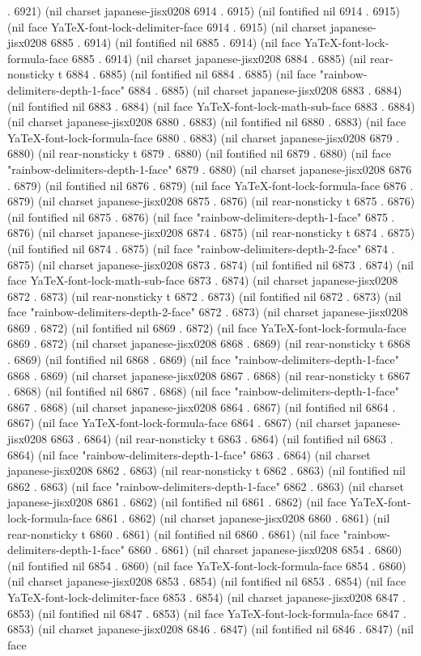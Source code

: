 . 6921) (nil charset japanese-jisx0208 6914 . 6915) (nil fontified nil 6914 . 6915) (nil face YaTeX-font-lock-delimiter-face 6914 . 6915) (nil charset japanese-jisx0208 6885 . 6914) (nil fontified nil 6885 . 6914) (nil face YaTeX-font-lock-formula-face 6885 . 6914) (nil charset japanese-jisx0208 6884 . 6885) (nil rear-nonsticky t 6884 . 6885) (nil fontified nil 6884 . 6885) (nil face "rainbow-delimiters-depth-1-face" 6884 . 6885) (nil charset japanese-jisx0208 6883 . 6884) (nil fontified nil 6883 . 6884) (nil face YaTeX-font-lock-math-sub-face 6883 . 6884) (nil charset japanese-jisx0208 6880 . 6883) (nil fontified nil 6880 . 6883) (nil face YaTeX-font-lock-formula-face 6880 . 6883) (nil charset japanese-jisx0208 6879 . 6880) (nil rear-nonsticky t 6879 . 6880) (nil fontified nil 6879 . 6880) (nil face "rainbow-delimiters-depth-1-face" 6879 . 6880) (nil charset japanese-jisx0208 6876 . 6879) (nil fontified nil 6876 . 6879) (nil face YaTeX-font-lock-formula-face 6876 . 6879) (nil charset japanese-jisx0208 6875 . 6876) (nil rear-nonsticky t 6875 . 6876) (nil fontified nil 6875 . 6876) (nil face "rainbow-delimiters-depth-1-face" 6875 . 6876) (nil charset japanese-jisx0208 6874 . 6875) (nil rear-nonsticky t 6874 . 6875) (nil fontified nil 6874 . 6875) (nil face "rainbow-delimiters-depth-2-face" 6874 . 6875) (nil charset japanese-jisx0208 6873 . 6874) (nil fontified nil 6873 . 6874) (nil face YaTeX-font-lock-math-sub-face 6873 . 6874) (nil charset japanese-jisx0208 6872 . 6873) (nil rear-nonsticky t 6872 . 6873) (nil fontified nil 6872 . 6873) (nil face "rainbow-delimiters-depth-2-face" 6872 . 6873) (nil charset japanese-jisx0208 6869 . 6872) (nil fontified nil 6869 . 6872) (nil face YaTeX-font-lock-formula-face 6869 . 6872) (nil charset japanese-jisx0208 6868 . 6869) (nil rear-nonsticky t 6868 . 6869) (nil fontified nil 6868 . 6869) (nil face "rainbow-delimiters-depth-1-face" 6868 . 6869) (nil charset japanese-jisx0208 6867 . 6868) (nil rear-nonsticky t 6867 . 6868) (nil fontified nil 6867 . 6868) (nil face "rainbow-delimiters-depth-1-face" 6867 . 6868) (nil charset japanese-jisx0208 6864 . 6867) (nil fontified nil 6864 . 6867) (nil face YaTeX-font-lock-formula-face 6864 . 6867) (nil charset japanese-jisx0208 6863 . 6864) (nil rear-nonsticky t 6863 . 6864) (nil fontified nil 6863 . 6864) (nil face "rainbow-delimiters-depth-1-face" 6863 . 6864) (nil charset japanese-jisx0208 6862 . 6863) (nil rear-nonsticky t 6862 . 6863) (nil fontified nil 6862 . 6863) (nil face "rainbow-delimiters-depth-1-face" 6862 . 6863) (nil charset japanese-jisx0208 6861 . 6862) (nil fontified nil 6861 . 6862) (nil face YaTeX-font-lock-formula-face 6861 . 6862) (nil charset japanese-jisx0208 6860 . 6861) (nil rear-nonsticky t 6860 . 6861) (nil fontified nil 6860 . 6861) (nil face "rainbow-delimiters-depth-1-face" 6860 . 6861) (nil charset japanese-jisx0208 6854 . 6860) (nil fontified nil 6854 . 6860) (nil face YaTeX-font-lock-formula-face 6854 . 6860) (nil charset japanese-jisx0208 6853 . 6854) (nil fontified nil 6853 . 6854) (nil face YaTeX-font-lock-delimiter-face 6853 . 6854) (nil charset japanese-jisx0208 6847 . 6853) (nil fontified nil 6847 . 6853) (nil face YaTeX-font-lock-formula-face 6847 . 6853) (nil charset japanese-jisx0208 6846 . 6847) (nil fontified nil 6846 . 6847) (nil face 